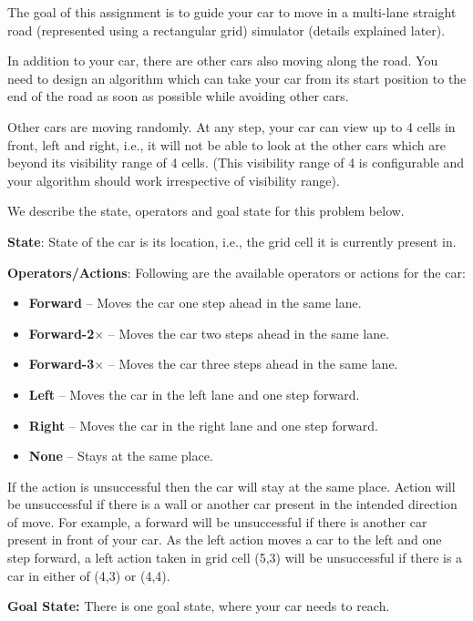 \documentclass[12pt, letterpaper]{article}
\newcommand{\mybox}[1]{\par\noindent\colorbox{shadecolor}
{\parbox{\dimexpr\textwidth-2\fboxsep\relax}{#1}}}
\begin{document}
\mybox{The goal of this assignment is to guide your car to move in a multi-lane straight road (represented using a rectangular grid) simulator (details explained later). 

In addition to your car, there are other cars also moving along the road. You need to design an algorithm which can take your car from its start position to the end of the road as soon as possible while avoiding other cars. 

Other cars are moving randomly. At any step, your car can view up to 4 cells in front, left and right, i.e., it will not be able to look at the other cars which are beyond its visibility range of 4 cells. (This visibility range of 4 is configurable and your algorithm should work irrespective of visibility range).

We describe the state, operators and goal state for this problem below.

\textbf{State}: State of the car is its location, i.e., the grid cell it is currently present in. 

\textbf{Operators/Actions}: Following are the available operators or actions for the car:

\begin{itemize}
    \item \textbf{Forward} – Moves the car one step ahead in the same lane.
    \item \textbf{Forward-2$\times$} – Moves the car two steps ahead in the same lane.
    \item \textbf{Forward-3$\times$} – Moves the car three steps ahead in the same lane.
    \item \textbf{Left} – Moves the car in the left lane and one step forward.
    \item \textbf{Right} – Moves the car in the right lane and one step forward.
    \item \textbf{None} – Stays at the same place.
\end{itemize}

If the action is unsuccessful then the car will stay at the same place. Action will be unsuccessful if there is a wall or another car present in the intended direction of move. For example, a forward will be unsuccessful if there is another car present in front of your car.
As the left action moves a car to the left and one step forward, a left action taken in grid cell (5,3) will be unsuccessful if there is a car in either of (4,3) or (4,4).

\textbf{Goal State:} There is one goal state, where your car needs to reach.}
\end{document}

